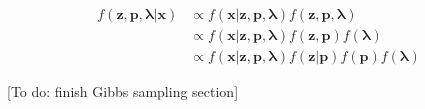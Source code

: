 \begin{DoubleSpace*}
\begin{align}
f(\textbf{z},\textbf{p},\boldsymbol{\lambda}|\textbf{x}) &\propto f(\textbf{x}|\textbf{z},\textbf{p},\boldsymbol{\lambda}) f(\textbf{z},\textbf{p},\boldsymbol{\lambda}) \\
&\propto f(\textbf{x}|\textbf{z},\textbf{p},\boldsymbol{\lambda})f(\textbf{z},\textbf{p}) f(\boldsymbol{\lambda}) \\
&\propto f(\textbf{x}|\textbf{z},\textbf{p},\boldsymbol{\lambda})f(\textbf{z}|\textbf{p}) f(\textbf{p}) f(\boldsymbol{\lambda})
\end{align}

[To do: finish Gibbs sampling section]

\end{DoubleSpace*}